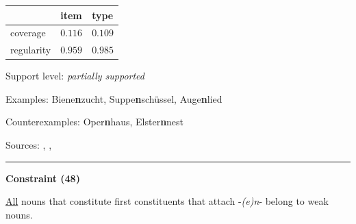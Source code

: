 \begin{table}[!ht]
\begin{center}

\begin{tabularx}{\columnwidth}{|X|X|X|}
\hline
 & item & type \\
\hline
 coverage & $0.116$ & $0.109$ \\
\hline
 regularity & $0.959$ & $0.985$ \\
\hline
\end{tabularx}
\end{center}
\end{table}

\vspace{-1.35em}

\noindent
Support level: \textit{partially supported}

\vspace{0.3em}

\noindent
Examples: Biene\textbf{n}zucht, Suppe\textbf{n}schüssel, Auge\textbf{n}lied

\noindent
Counterexamples: Oper\textbf{n}haus, Elster\textbf{n}nest

\vspace{0.3em}

\noindent
Sources: \citet[18]{kuerschner_2010}, \citet[84]{nuebling_szczepaniak_2013}, \citet[179]{wegener_2005}


\hrule




\vspace{0.4em}

\begin{center}
\textbf{Constraint (48)}
\end{center}

\noindent
\underline{All} nouns that constitute first constituents that attach -\textit{(e)n}- belong to weak nouns.
\vspace{0.35em}


